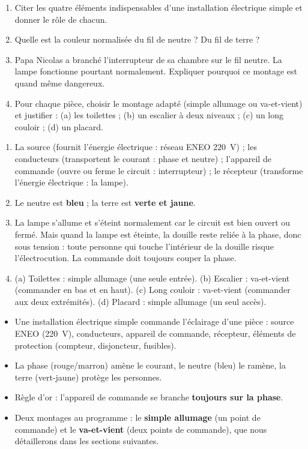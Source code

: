 \documentclass[11pt]{article}
\begin{document}
\begin{exercice}
\begin{enumerate}
\item Citer les quatre éléments indispensables d'une installation électrique simple et donner le rôle de chacun.
\item Quelle est la couleur normalisée du fil de neutre ? Du fil de terre ?
\item Papa Nicolas a branché l'interrupteur de sa chambre sur le fil neutre. La lampe fonctionne pourtant normalement. Expliquer pourquoi ce montage est quand même dangereux.
\item Pour chaque pièce, choisir le montage adapté (simple allumage ou va-et-vient) et justifier : (a) les toilettes ; (b) un escalier à deux niveaux ; (c) un long couloir ; (d) un placard.
\end{enumerate}
\end{exercice}

\begin{corrige}
\begin{enumerate}
\item La source (fournit l'énergie électrique : réseau ENEO \SI{220}{V}) ; les conducteurs (transportent le courant : phase et neutre) ; l'appareil de commande (ouvre ou ferme le circuit : interrupteur) ; le récepteur (transforme l'énergie électrique : la lampe).
\item Le neutre est \textbf{bleu} ; la terre est \textbf{verte et jaune}.
\item La lampe s'allume et s'éteint normalement car le circuit est bien ouvert ou fermé. Mais quand la lampe est éteinte, la douille reste reliée à la phase, donc sous tension : toute personne qui touche l'intérieur de la douille risque l'électrocution. La commande doit toujours couper la phase.
\item (a) Toilettes : simple allumage (une seule entrée). (b) Escalier : va-et-vient (commander en bas et en haut). (c) Long couloir : va-et-vient (commander aux deux extrémités). (d) Placard : simple allumage (un seul accès).
\end{enumerate}
\end{corrige}

\begin{aretenir}
\begin{itemize}
\item Une installation électrique simple commande l'éclairage d'une pièce : source ENEO (\SI{220}{V}), conducteurs, appareil de commande, récepteur, éléments de protection (compteur, disjoncteur, fusibles).
\item La phase (rouge/marron) amène le courant, le neutre (bleu) le ramène, la terre (vert-jaune) protège les personnes.
\item Règle d'or : l'appareil de commande se branche \textbf{toujours sur la phase}.
\item Deux montages au programme : le \textbf{simple allumage} (un point de commande) et le \textbf{va-et-vient} (deux points de commande), que nous détaillerons dans les sections suivantes.
\end{itemize}
\end{aretenir}
\end{document}
